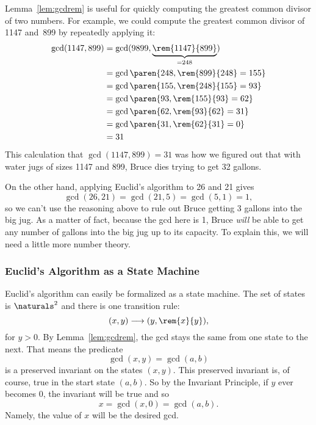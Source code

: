 Lemma~\ref{lem:gcdrem} is useful for quickly computing the greatest
common divisor of two numbers.  For example, we could compute the
greatest common divisor of 1147 and~899 by repeatedly applying it:
\begin{align*}
\gcd(1147, 899) &= \gcd(9899, \underbrace{\rem{1147}{899}}_{{} = 248}) \\
&= \gcd\paren{248, \rem{899}{248} = 155} \\
&= \gcd\paren{155, \rem{248}{155} = 93} \\
&= \gcd\paren{ 93, \rem{155}{93} = 62}\\
&= \gcd\paren{ 62, \rem{93}{62} = 31} \\
&= \gcd\paren{ 31, \rem{62}{31} = 0} \\
&= 31
\end{align*}
This calculation that $\gcd(1147, 899) = 31$ was how we figured out
that with water jugs of sizes 1147 and 899, Bruce dies trying to get
32 gallons.

On the other hand, applying Euclid's algorithm to 26 and 21 gives
\[
\gcd(26, 21) = \gcd(21, 5) = \gcd(5, 1) = 1,
\]
so we can't use the reasoning above to rule out Bruce getting 3
gallons into the big jug.  As a matter of fact, because the gcd here
is 1, Bruce \emph{will} be able to get any number of gallons into the big jug
up to its capacity.  To explain this, we will need a little more
number theory.

\subsubsection{Euclid's Algorithm as a State Machine}
Euclid's algorithm can easily be formalized as a state
machine.  The set of states is $\naturals^2$ and there is one
transition rule:
\begin{equation}\label{euclid_transition}
(x,y) \movesto (y, \rem{x}{y}),
\end{equation}
for $y>0$.  By Lemma~\ref{lem:gcdrem}, the gcd stays the same from one
state to the next.  That means the predicate
\[
\gcd(x,y) = \gcd(a,b)
\]
is a preserved invariant on the states $(x,y)$.  This preserved
invariant is, of course, true in the start state $(a,b)$.  So by the
Invariant Principle, if $y$ ever becomes $0$, the invariant will be
true and so
\[
x = \gcd(x,0) = \gcd(a,b).
\]
Namely, the value of $x$ will be the desired gcd.

